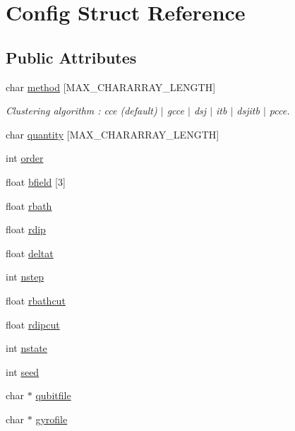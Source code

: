 \hypertarget{structConfig}{\section{Config Struct Reference}
\label{structConfig}
}
\subsection*{Public Attributes}
\begin{DoxyCompactItemize}
\item 
char \hyperlink{structConfig_a73d927bf5bdb0f39d024b23dc66f0c1c}{method} \mbox{[}M\-A\-X\-\_\-\-C\-H\-A\-R\-A\-R\-R\-A\-Y\-\_\-\-L\-E\-N\-G\-T\-H\mbox{]}
\begin{DoxyCompactList}\small\item\em Clustering algorithm \-: cce (default) $|$ gcce $|$ dsj $|$ itb $|$ dsjitb $|$ pcce. \end{DoxyCompactList}\item 
char \hyperlink{structConfig_a408cf9618ed41aefd0b0c323f57e0730}{quantity} \mbox{[}M\-A\-X\-\_\-\-C\-H\-A\-R\-A\-R\-R\-A\-Y\-\_\-\-L\-E\-N\-G\-T\-H\mbox{]}
\item 
int \hyperlink{structConfig_a3a9071ea9a9409cefb8cbcea2184c879}{order}
\item 
float \hyperlink{structConfig_abf4c62b17ba762512fab9da0f1e193be}{bfield} \mbox{[}3\mbox{]}
\item 
float \hyperlink{structConfig_a79389333cffeb4063cf1d39e89234c57}{rbath}
\item 
float \hyperlink{structConfig_af9d5e3a3b185555cbe04ad12733612b1}{rdip}
\item 
float \hyperlink{structConfig_a6539de558079f55df76dce79c4079b33}{deltat}
\item 
int \hyperlink{structConfig_acd1675410784e93a9c9866de0c64807e}{nstep}
\item 
float \hyperlink{structConfig_a2eeef76fa44792c24c3320ff6b4d19c8}{rbathcut}
\item 
float \hyperlink{structConfig_a39b6cf20220772b2326ddf423bf3a3f7}{rdipcut}
\item 
int \hyperlink{structConfig_a91b2aadf805896022127036ded259e79}{nstate}
\item 
int \hyperlink{structConfig_a92ed038fd7676ed62640f59270a60545}{seed}
\item 
char $\ast$ \hyperlink{structConfig_a9f5ed3dfb6ae52627a94099cb837cfbf}{qubitfile}
\item 
char $\ast$ \hyperlink{structConfig_a735f7f25b0847d08468616025a27ffe5}{gyrofile}

\end{DoxyCompactItemize}
